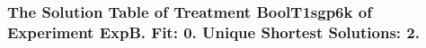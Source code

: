  \begin{frame}
 \fontsize{8pt}{9pt}\selectfont
 \frametitle{ The Solution Table of Treatment BoolT1sgp6k of Experiment ExpB. Fit: 0. Unique Shortest Solutions: 2. }

 \label{ExpBSolutionTable009.tex}  
 \end{frame}

